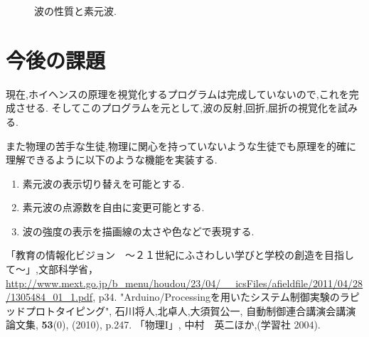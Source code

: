 \documentclass[a4j,twocolumn,uplatex]{jarticle}
\begin{document}
\begin{figure}[htbp]
\caption{{\footnotesize 波の性質と素元波\cite{kyoukasyo}.}}
\label{fig:thomson2clausius}
\end{figure}
\vspace{-7mm}

\section{今後の課題}
現在,ホイヘンスの原理を視覚化するプログラムは完成していないので,これを完成させる.
そしてこのプログラムを元として,波の反射,回折,屈折の視覚化を試みる.

また物理の苦手な生徒,物理に関心を持っていないような生徒でも原理を的確に理解できるように以下のような機能を実装する.
\begin{enumerate}
\item 素元波の表示切り替えを可能とする.
\item 素元波の点源数を自由に変更可能とする.
\item 波の強度の表示を描画線の太さや色などで表現する.
\end{enumerate}

\vspace{-5mm}
\begin{thebibliography}{9}
「教育の情報化ビジョン　〜２１世紀にふさわしい学びと学校の創造を目指して〜」,文部科学省，\url{http://www.mext.go.jp/b_menu/houdou/23/04/__icsFiles/afieldfile/2011/04/28/1305484_01_1.pdf}, p34.
 "Arduino/Processingを用いたシステム制御実験のラピッドプロトタイピング", 石川将人,北卓人,大須賀公一, 自動制御連合講演会講演論文集, {\bf 53}(0), (2010), p.247.
 「物理I」, 中村　英二ほか,(学習社 2004).


\end{thebibliography}
\end{document}
